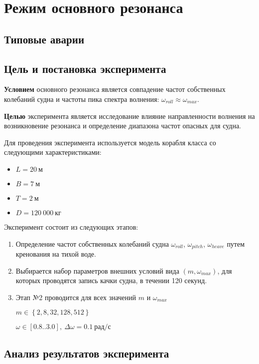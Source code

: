 \section{Режим основного резонанса}

\subsection{Типовые аварии}


\subsection{Цель и постановка эксперимента}

\textbf{Условием} основного резонанса является совпадение частот собственных колебаний судна и частоты пика спектра волнения: $\omega_{roll} \approx \omega_{max}$.

\textbf{Целью} эксперимента является исследование влияние направленности волнения на возникновение резонанса и определение диапазона частот опасных для судна.

Для проведения эксперимента используется модель корабля класса  со следующими характеристиками:
\begin{itemize}
	\item	$L = 20\ \text{м}$
	\item	$B = 7\ \text{м}$
	\item	$T = 2\ \text{м}$
	\item	$D = 120\ 000\ \text{кг}$
\end{itemize}

Эксперимент состоит из следующих этапов:
\begin{enumerate}
	\item	Определение частот собственных колебаний судна 
			$\omega_{roll}$, $\omega_{pitch}$, $\omega_{heave}$ путем кренования на тихой воде.
	\item	Выбирается набор параметров внешних условий вида $(m, \omega_{max})$, для которых
			проводятся запись качки судна, в течении 120 секунд.
	\item	Этап №2	проводится для всех значений $m$ и $\omega_{max}$
	
			$m \in \left\lbrace 2,8,32,128,512 \right\rbrace$
			
			$\omega \in [0.8..3.0],\ \Delta\omega=0.1\ \text{рад/с}$ 

\end{enumerate}

\subsection{Анализ результатов эксперимента}

